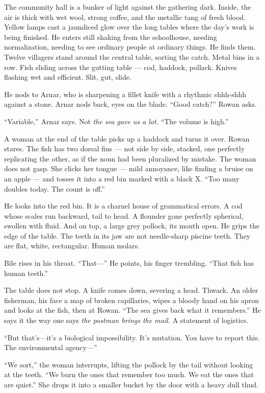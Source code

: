 \documentclass[11pt,oneside]{book}
\newcommand{\sceneline}{%
  \par\vspace{1.2em}
  \begin{center}
    \fontsize{11}{11}\selectfont \textbullet\quad\textbullet\quad\textbullet
  \end{center}
  \vspace{0.6em}\noindent\ignorespaces
}
\begin{document}
\sceneline

The community hall is a bunker of light against the gathering dark.
Inside, the air is thick with wet wool, strong coffee, and the metallic
tang of fresh blood. Yellow lamps cast a jaundiced glow over the long
tables where the day's work is being finished. He enters still shaking
from the schoolhouse, needing normalization, needing to see ordinary
people at ordinary things. He finds them. Twelve villagers stand around
the central table, sorting the catch. Metal bins in a row. Fish sliding
across the gutting table --- cod, haddock, pollack. Knives flashing wet
and efficient. Slit, gut, slide.

He nods to Arnar, who is sharpening a fillet knife with a rhythmic
shhh-shhh against a stone. Arnar nods back, eyes on the blade. ``Good
catch?'' Rowan asks.

``Variable,'' Arnar says. Not \emph{the sea gave us a lot.} ``The volume
is high.''

A woman at the end of the table picks up a haddock and turns it over.
Rowan stares. The fish has two dorsal fins --- not side by side,
stacked, one perfectly replicating the other, as if the noun had been
pluralized by mistake. The woman does not gasp. She clicks her tongue
--- mild annoyance, like finding a bruise on an apple --- and tosses it
into a red bin marked with a black X. ``Too many doubles today. The
count is off.''

He looks into the red bin. It is a charnel house of grammatical errors.
A cod whose scales run backward, tail to head. A flounder gone perfectly
spherical, swollen with fluid. And on top, a large grey pollock, its
mouth open. He grips the edge of the table. The teeth in its jaw are not
needle-sharp piscine teeth. They are flat, white, rectangular. Human
molars.

Bile rises in his throat. ``That---'' He points, his finger trembling.
``That fish has human teeth.''

The table does not stop. A knife comes down, severing a head. Thwack. An
older fisherman, his face a map of broken capillaries, wipes a bloody
hand on his apron and looks at the fish, then at Rowan. ``The sea gives
back what it remembers.'' He says it the way one says \emph{the postman
brings the mail.} A statement of logistics.

``But that's---it's a biological impossibility. It's mutation. You have
to report this. The environmental agency---''

``We sort,'' the woman interrupts, lifting the pollock by the tail
without looking at the teeth. ``We burn the ones that remember too much.
We eat the ones that are quiet.'' She drops it into a smaller bucket by
the door with a heavy dull thud.
\end{document}
